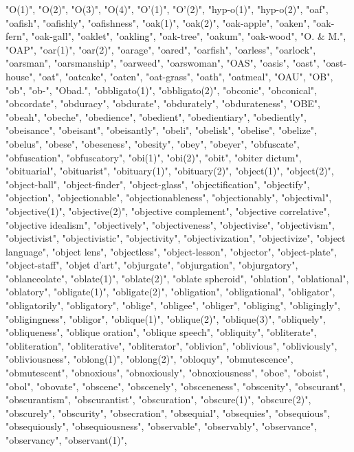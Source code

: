 "O(1)",
"O(2)",
"O(3)",
"O(4)",
"O'(1)",
"O'(2)",
"hyp-o(1)",
"hyp-o(2)",
"oaf",
"oafish",
"oafishly",
"oafishness",
"oak(1)",
"oak(2)",
"oak-apple",
"oaken",
"oak-fern",
"oak-gall",
"oaklet",
"oakling",
"oak-tree",
"oakum",
"oak-wood",
"O. \& M.",
"OAP",
"oar(1)",
"oar(2)",
"oarage",
"oared",
"oarfish",
"oarless",
"oarlock",
"oarsman",
"oarsmanship",
"oarweed",
"oarswoman",
"OAS",
"oasis",
"oast",
"oast-house",
"oat",
"oatcake",
"oaten",
"oat-grass",
"oath",
"oatmeal",
"OAU",
"OB",
"ob",
"ob-",
"Obad.",
"obbligato(1)",
"obbligato(2)",
"obconic",
"obconical",
"obcordate",
"obduracy",
"obdurate",
"obdurately",
"obdurateness",
"OBE",
"obeah",
"obeche",
"obedience",
"obedient",
"obedientiary",
"obediently",
"obeisance",
"obeisant",
"obeisantly",
"obeli",
"obelisk",
"obelise",
"obelize",
"obelus",
"obese",
"obeseness",
"obesity",
"obey",
"obeyer",
"obfuscate",
"obfuscation",
"obfuscatory",
"obi(1)",
"obi(2)",
"obit",
"obiter dictum",
"obituarial",
"obituarist",
"obituary(1)",
"obituary(2)",
"object(1)",
"object(2)",
"object-ball",
"object-finder",
"object-glass",
"objectification",
"objectify",
"objection",
"objectionable",
"objectionableness",
"objectionably",
"objectival",
"objective(1)",
"objective(2)",
"objective complement",
"objective correlative",
"objective idealism",
"objectively",
"objectiveness",
"objectivise",
"objectivism",
"objectivist",
"objectivistic",
"objectivity",
"objectivization",
"objectivize",
"object language",
"object lens",
"objectless",
"object-lesson",
"objector",
"object-plate",
"object-staff",
"objet d'art",
"objurgate",
"objurgation",
"objurgatory",
"oblanceolate",
"oblate(1)",
"oblate(2)",
"oblate spheroid",
"oblation",
"oblational",
"oblatory",
"obligate(1)",
"obligate(2)",
"obligation",
"obligational",
"obligator",
"obligatorily",
"obligatory",
"oblige",
"obligee",
"obliger",
"obliging",
"obligingly",
"obligingness",
"obligor",
"oblique(1)",
"oblique(2)",
"oblique(3)",
"obliquely",
"obliqueness",
"oblique oration",
"oblique speech",
"obliquity",
"obliterate",
"obliteration",
"obliterative",
"obliterator",
"oblivion",
"oblivious",
"obliviously",
"obliviousness",
"oblong(1)",
"oblong(2)",
"obloquy",
"obmutescence",
"obmutescent",
"obnoxious",
"obnoxiously",
"obnoxiousness",
"oboe",
"oboist",
"obol",
"obovate",
"obscene",
"obscenely",
"obsceneness",
"obscenity",
"obscurant",
"obscurantism",
"obscurantist",
"obscuration",
"obscure(1)",
"obscure(2)",
"obscurely",
"obscurity",
"obsecration",
"obsequial",
"obsequies",
"obsequious",
"obsequiously",
"obsequiousness",
"observable",
"observably",
"observance",
"observancy",
"observant(1)",

